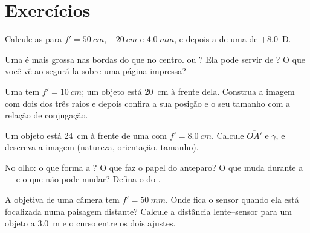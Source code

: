 \section{Exercícios}

\begin{exercise}[$\star$]\label{exo:g11:lenses-and-eye:1}
Calcule as  para $f' = \qty{50}{cm}$, $\qty{-20}{cm}$ e
$\qty{4.0}{mm}$, e depois a  de uma  de $+8.0$~D.
\end{exercise}

\begin{exercise}[$\star$]\label{exo:g11:lenses-and-eye:2}
Uma  é mais grossa nas bordas do que no centro.  ou
? Ela pode servir de ? O que você vê ao segurá-la sobre uma
página impressa?
\end{exercise}

\begin{exercise}[$\star$]\label{exo:g11:lenses-and-eye:3}
Uma  tem $f' = \qty{10}{cm}$; um objeto está
\qty{20}{cm} à frente dela. Construa a imagem com dois dos três raios e
depois confira a sua posição e o seu tamanho com a relação de
conjugação.
\end{exercise}

\begin{exercise}[$\star$]\label{exo:g11:lenses-and-eye:4}
Um objeto está \qty{24}{cm} à frente de uma  com
$f' = \qty{8.0}{cm}$. Calcule $\overline{OA'}$ e $\gamma$, e descreva a
imagem (natureza, orientação, tamanho).
\end{exercise}

\begin{exercise}[$\star$]\label{exo:g11:lenses-and-eye:5}
No olho: o que forma a ? O que faz o papel do anteparo?
O que muda durante a  --- e o que não pode mudar? Defina o
 do .
\end{exercise}

\begin{exercise}[$\star\star$]\label{exo:g11:lenses-and-eye:6}
A objetiva de uma câmera tem $f' = \qty{50}{mm}$. Onde fica o sensor
quando ela está focalizada numa paisagem distante? Calcule a distância
lente--sensor para um objeto a \qty{3.0}{m} e o curso entre os dois
ajustes.
\end{exercise}


